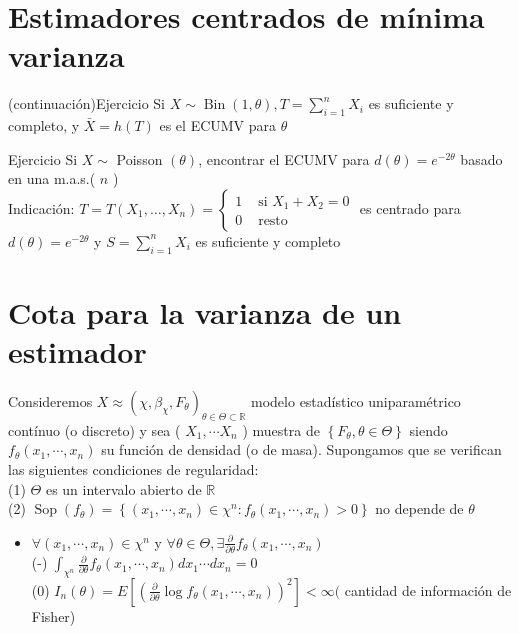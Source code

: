 \section*{Estimadores centrados de mínima varianza}
 (continuación)Ejercicio Si $X \sim \operatorname{Bin}(1, \theta), T=\sum_{i=1}^{n} X_{i}$ es suficiente y completo, y $\bar{X}=h(T)$ es el ECUMV para $\theta$

Ejercicio Si $X \sim$ Poisson $(\theta)$, encontrar el ECUMV para $d(\theta)=e^{-2 \theta}$ basado en una m.a.s.( $n$ )\\
Indicación: $T=T\left(X_{1}, \ldots, X_{n}\right)=\left\{\begin{array}{ll}1 & \text { si } X_{1}+X_{2}=0 \\ 0 & \text { resto }\end{array}\right.$ es centrado para $d(\theta)=e^{-2 \theta}$ y $S=\sum_{i=1}^{n} X_{i}$ es suficiente y completo

\section*{Cota para la varianza de un estimador}
Consideremos $X \approx\left(\chi, \beta_{\chi}, F_{\theta}\right)_{\theta \in \Theta \subset \mathbb{R}}$ modelo estadístico uniparamétrico contínuo (o discreto) y sea ( $X_{1}, \cdots X_{n}$ ) muestra de $\left\{F_{\theta}, \theta \in \Theta\right\}$ siendo $f_{\theta}\left(x_{1}, \cdots, x_{n}\right)$ su función de densidad (o de masa). Supongamos que se verifican las siguientes condiciones de regularidad:\\
(1) $\Theta$ es un intervalo abierto de $\mathbb{R}$\\
(2) $\operatorname{Sop}\left(f_{\theta}\right)=\left\{\left(x_{1}, \cdots, x_{n}\right) \in \chi^{n}: f_{\theta}\left(x_{1}, \cdots, x_{n}\right)>0\right\}$ no depende de $\theta$

\begin{itemize}
  \item $\forall\left(x_{1}, \cdots, x_{n}\right) \in \chi^{n}$ y $\forall \theta \in \Theta, \exists \frac{\partial}{\partial \theta} f_{\theta}\left(x_{1}, \cdots, x_{n}\right)$\\
        (-) $\int_{\chi^{n}} \frac{\partial}{\partial \theta} f_{\theta}\left(x_{1}, \cdots, x_{n}\right) d x_{1} \cdots d x_{n}=0$\\
        (0) $I_{n}(\theta)=E\left[\left(\frac{\partial}{\partial \theta} \log f_{\theta}\left(x_{1}, \cdots, x_{n}\right)\right)^{2}\right]<\infty($ cantidad de información de Fisher)
\end{itemize}

